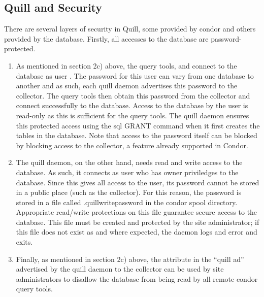 \subsection{\label{sec:Quill-Security}Quill and Security}

There are several layers of security in Quill, some provided by condor and
others provided by the database.  Firstly, all accesses to the database
are password-protected.

\begin{enumerate}
\item As mentioned in section 2c) above, the query tools,  and
 connect to the database as user .
The password for this user can vary from one database to another and
as such, each quill daemon advertises this password to the collector.
The query tools then obtain this password from the collector and
connect successfully to the database.  Access to the database by the
 user is read-only as this is sufficient for the
query tools.  The quill daemon ensures this protected access using the sql
GRANT command when it first creates the tables in the database.  Note that
access to the  password itself can be blocked by
blocking access to the collector, a feature already supported in Condor.

\item The quill daemon, on the other hand, needs read and write access
to the database.  As such, it connects as user 
who has owner priviledges to the database.  Since this gives all
access to the  user, its password cannot
be stored in a public place (such as the collector).  For this
reason, the  password is stored in a file called
.quillwritepassword in the condor spool directory.  Appropriate read/write
protections on this file guarantee secure access to the database.
This file must be created and protected by the site administrator;
if this file does not exist as and where expected, the 
daemon logs and error and exits.

\item Finally, as mentioned in section 2c) above, the
 attribute in the ``quill ad'' advertised
by the quill daemon to the collector can be used by site administrators
to disallow the database from being read by all remote condor query tools.

\end{enumerate}

